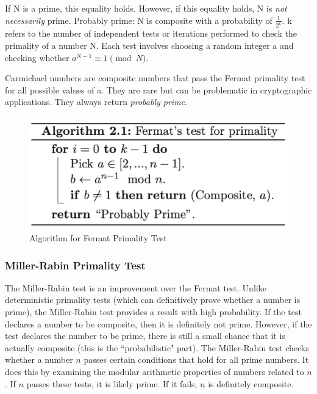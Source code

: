 If N is a prime, this equality holds. However, if this equality holds, N is \emph{not necessarily} prime. Probably prime: N is composite with a probability of $\frac{1}{2^k}$. k refers to the number of independent tests or iterations performed to check the primality of a number N. Each test involves choosing a random integer a and checking whether $a^{N-1} \equiv 1 \pmod{N}$.

\begin{rem}
    Carmichael numbers are composite numbers that pass the Fermat primality test for all possible values of a. They are rare but can be problematic in cryptographic applications. They always return \emph{probably prime}. 
\end{rem}

\begin{figure}[h!]
    \centering
    \includegraphics[scale=0.7]{img/fermatprimetest.png}
    \caption{Algorithm for Fermat Primality Test}
\end{figure}

\subsubsection{Miller-Rabin Primality Test}
The Miller-Rabin test is an improvement over the Fermat test. Unlike deterministic primality tests (which can definitively prove whether a number is prime), the Miller-Rabin test provides a result with high probability. If the test declares a number to be composite, then it is definitely not prime. However, if the test declares the number to be prime, there is still a small chance that it is actually composite (this is the ``probabilistic" part). The Miller-Rabin test checks whether a number $n$ passes certain conditions that hold for all prime numbers. It does this by examining the modular arithmetic properties of numbers related to $n$. If $n$ passes these tests, it is likely prime. If it fails, $n$ is definitely composite.

